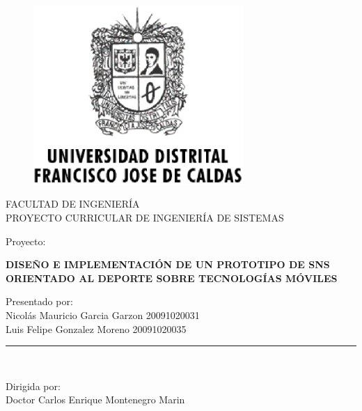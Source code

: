 \documentclass[letter,12pt]{book}
\begin{document}
  \begin{titlepage}

    \begin{center}
      \vspace*{-1in}
      \begin{figure}[htb]
    \begin{center}
      \includegraphics[width=8cm]{imagenes/Logo_Distrital.eps}
    \end{center}
    \end{figure}

    FACULTAD DE INGENIERÍA\\
    \vspace*{0.15in}
    PROYECTO CURRICULAR DE INGENIERÍA DE SISTEMAS \\
    \vspace*{0.6in}
    \begin{large}
    Proyecto:\\
    \end{large}
    \vspace*{0.2in}
    \begin{Large}
    \textbf{DISEÑO E IMPLEMENTACIÓN DE UN PROTOTIPO DE SNS ORIENTADO AL DEPORTE SOBRE TECNOLOGÍAS MÓVILES} \\ 
    \end{Large}
    \vspace*{0.3in}
    \begin{large}
    Presentado por:\\
      Nicolás Mauricio Garcia Garzon 20091020031 \\
      Luis Felipe Gonzalez Moreno 20091020035
    \end{large}
    \vspace*{0.3in}
    \rule{80mm}{0.1mm}\\
    \vspace*{0.1in}
    \begin{large}
    Dirigida por: \\
    Doctor Carlos Enrique Montenegro Marin
    \end{large}
    \end{center}

    \end{titlepage}
\end{document}
